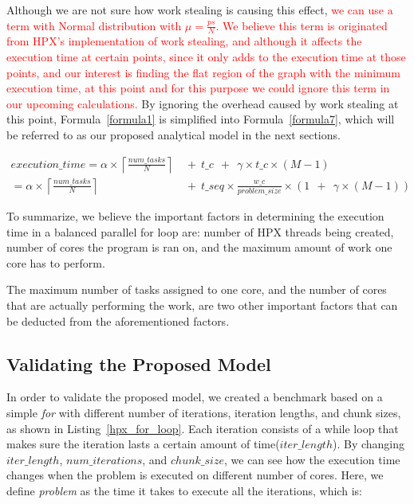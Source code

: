  Although we are not sure how work stealing is causing this effect, \textcolor{red}{we can use a term with Normal distribution with $\mu=\frac{ps}{N}$. We believe this term is originated from HPX's implementation of work stealing, and although it affects the execution time at certain points, since it only adds to the execution time at those points, and our interest is finding the flat region of the graph with the minimum execution time, at this point and for this purpose we could ignore this term in our upcoming calculations.}  
By ignoring the overhead caused by work stealing at this point, Formula~\ref{formula1} is simplified into Formula~\ref{formula7}, which will be referred to as our proposed analytical model in the next sections. 

\begin{equation}\label{formula7}
\begin{aligned}
execution\_time = 
\alpha\times{\left\lceil{\frac{num\_{tasks}}{N}}\right\rceil}\:\:&+\:\:t\_c\:\:+\:\:\gamma\times{t\_c}\times{(M-1)}\\
=\alpha\times{\left\lceil{\frac{num\_{tasks}}{N}}\right\rceil}\:\:&+\:\:t\_{seq}\times{\frac{w\_c}{problem\_{size}}}\times{(1\:\:+\:\:\gamma\times{(M-1)})}
\end{aligned}
\end{equation}

To summarize, we believe the important factors in determining the execution time in a balanced parallel for loop are: number of HPX threads being created, number of cores the program is ran on, and the maximum amount of work one core has to perform. 

The maximum number of tasks assigned to one core, and the number of cores that are actually performing the work, are two other important factors that can be deducted from the aforementioned factors. 


\vspace{\baselineskip}
\subsection{Validating the Proposed Model}
In order to validate the proposed model, we created a benchmark based on a simple \textit{for} with different number of iterations, iteration lengths, and chunk sizes, as shown in Listing~\ref{hpx_for_loop}. 
Each iteration consists of a while loop that makes sure the iteration lasts a certain amount of time($iter\_{length}$). By changing $iter\_{length}$, $num\_{iterations}$, and $chunk\_{size}$, we can see how the execution time changes when the problem is executed on different number of cores. Here, we define \textit{problem} as the time it takes to execute all the iterations, which is:

